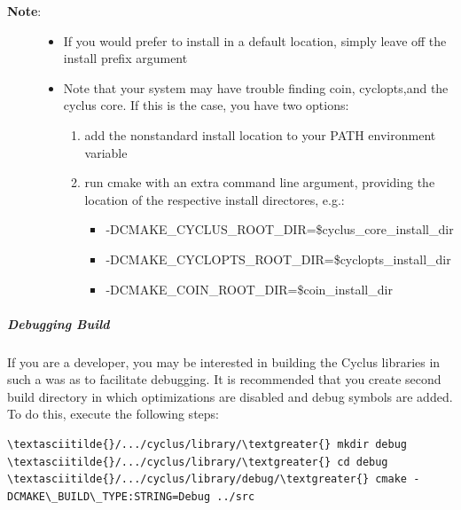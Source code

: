\documentclass[letterpaper,10pt,english]{sphinxmanual}
\begin{document}
\begin{description}
\item[{\textbf{Note}:}] \leavevmode\begin{itemize}
\item {} 
If you would prefer to install in a default location, simply leave off the install prefix argument

\item {} 
Note that your system may have trouble finding coin, cyclopts,and the cyclus core. If this is the case, you have two options:
\begin{enumerate}
\item {} 
add the nonstandard install location to your PATH environment variable

\item {} 
run cmake with an extra command line argument, providing the location of the respective install directores, e.g.:
\begin{itemize}
\item {} 
-DCMAKE\_CYCLUS\_ROOT\_DIR=\$cyclus\_core\_install\_dir

\item {} 
-DCMAKE\_CYCLOPTS\_ROOT\_DIR=\$cyclopts\_install\_dir

\item {} 
-DCMAKE\_COIN\_ROOT\_DIR=\$coin\_install\_dir

\end{itemize}

\end{enumerate}

\end{itemize}

\end{description}


\subparagraph{Debugging Build}
\label{devdoc/get_and_build:debugging-build}
If you are a developer, you may be interested in building the Cyclus
libraries in such a was as to facilitate debugging. It is recommended
that you create second build directory in which optimizations are
disabled and debug symbols are added. To do this, execute the
following steps:

\begin{Verbatim}[commandchars=\\\{\}]
\textasciitilde{}/.../cyclus/library/\textgreater{} mkdir debug
\textasciitilde{}/.../cyclus/library/\textgreater{} cd debug
\textasciitilde{}/.../cyclus/library/debug/\textgreater{} cmake -DCMAKE\_BUILD\_TYPE:STRING=Debug ../src
\end{Verbatim}
\end{document}
